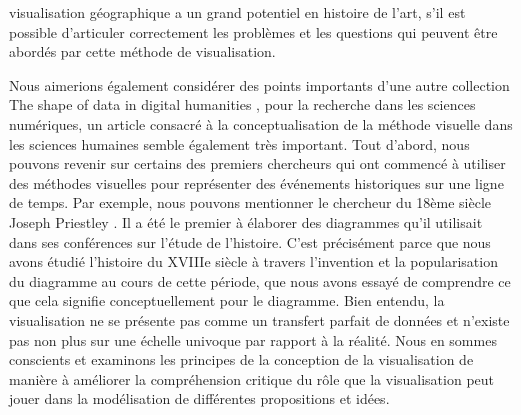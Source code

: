 \documentclass[a4paper, twoside, 12pt]{book}
\begin{document}
visualisation géographique a un grand potentiel en histoire de l'art, s'il est possible d'articuler correctement les problèmes et les questions qui peuvent être abordés par cette méthode de visualisation.

Nous aimerions également considérer des points importants d'une autre collection The shape of data in digital humanities , pour la recherche dans les sciences numériques, un article consacré à la conceptualisation de la méthode visuelle dans les sciences humaines semble également très important. Tout d'abord, nous pouvons revenir sur certains des premiers chercheurs qui ont commencé à utiliser des méthodes visuelles pour représenter des événements historiques sur une ligne de temps. Par exemple, nous pouvons mentionner le chercheur du 18ème siècle Joseph Priestley . Il a été le premier à élaborer des diagrammes qu'il utilisait dans ses conférences sur l'étude de l'histoire. C'est précisément parce que nous avons étudié l'histoire du XVIIIe siècle à travers l'invention et la popularisation du diagramme au cours de cette période, que nous avons essayé de comprendre ce que cela signifie conceptuellement pour le diagramme. Bien entendu, la visualisation ne se présente pas comme un transfert parfait de données et n'existe pas non plus sur une échelle univoque par rapport à la réalité. Nous en sommes conscients et examinons les principes de la conception de la visualisation de manière à améliorer la compréhension critique du rôle que la visualisation peut jouer dans la modélisation de différentes propositions et idées. 
\end{document}
